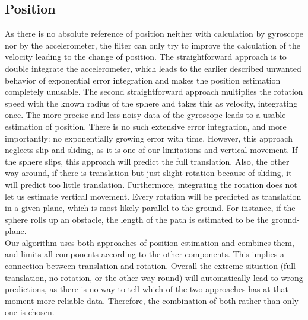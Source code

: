\documentclass[letterpaper, 10 pt, conference]{ieeeconf}  %
\begin{document}
\subsection{Position}
As there is no absolute reference of position neither with calculation by gyroscope nor by the accelerometer, the filter can only try to improve the calculation of the velocity leading to the change of position. 
The straightforward approach is to double integrate the accelerometer, which leads to the earlier described unwanted behavior of exponential error integration and makes the position estimation completely unusable. 
The second straightforward approach multiplies the rotation speed with the known radius of the sphere and takes this as velocity, integrating once.
The more precise and less noisy data of the gyroscope leads to a usable estimation of position. 
There is no such extensive error integration, and more importantly: no exponentially growing error with time. However, this approach neglects slip and sliding, as it is one of our limitations and vertical movement. 
If the sphere slips, this approach will predict the full translation.
Also, the other way around, if there is translation but just slight rotation because of sliding, it will predict too little translation. 
Furthermore, integrating the rotation does not let us estimate vertical movement.
Every rotation will be predicted as translation in a given plane, which is most likely parallel to the ground. 
For instance, if the sphere rolls up an obstacle, the length of the path is estimated to be the ground-plane.\\
Our algorithm uses both approaches of position estimation and combines them, and limits all components according to the other components. 
This implies a connection between translation and rotation. 
Overall the extreme situation (full translation, no rotation, or the other way round) will automatically lead to wrong predictions, as there is no way to tell which of the two approaches has at that moment more reliable data.
Therefore, the combination of both rather than only one is chosen.
\end{document}
